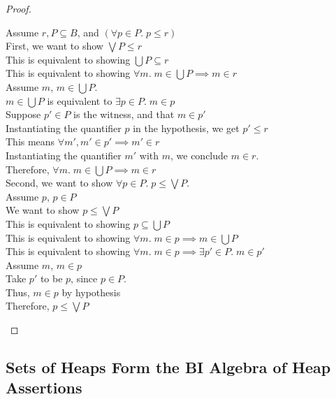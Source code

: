 \begin{proof}
\begin{enumerate}
  \begin{tabbedproof}
    \oo Assume $r, P \subseteq B$, and $(\forall p \in P.\; p \leq r)$ \\[1em]
    \ooo First, we want to show $\bigvee P \leq r$ \\
    \oooo This is equivalent to showing $\bigcup P \subseteq r$ \\
    \oooo This is equivalent to showing $\forall m.\; m \in \bigcup P \implies m \in r$ \\
    \oooo Assume $m$, $m \in \bigcup P$. \\
    \ooooo $m \in \bigcup P$ is equivalent to $\exists p \in P.\; m \in p$ \\
    \ooooo Suppose $p' \in P$ is the witness, and that $m \in p'$ \\ 
    \oooooo Instantiating the quantifier $p$ in the hypothesis, we get $p' \leq r$ \\
    \oooooo This means $\forall m', m' \in p' \implies m' \in r$ \\
    \oooooo Instantiating the quantifier $m'$ with $m$,  we conclude $m \in r$.  \\
    \oooo Therefore, $\forall m.\; m \in \bigcup P \implies m \in r$ \\[1em]
    \ooo Second, we want to show $\forall p \in P.\; p \leq \bigvee P$. \\
    \oooo Assume $p$, $p \in P$ \\
    \ooooo We want to show $p \leq \bigvee P$ \\
    \ooooo This is equivalent to showing $p \subseteq \bigcup P$ \\
    \ooooo This is equivalent to showing $\forall m.\; m \in p \implies m \in \bigcup P$ \\
    \ooooo This is equivalent to showing $\forall m.\; m \in p \implies \exists p' \in P.\; m \in p'$ \\
    \ooooo Assume $m$, $m \in p$ \\
    \oooooo Take $p'$ to be $p$, since $p \in P$. \\
    \oooooo Thus, $m \in p$ by hypothesis \\
    \oooo Therefore, $p \leq \bigvee P$ \\
  \end{tabbedproof}

\end{enumerate}


\end{proof}

\subsection{Sets of Heaps Form the BI Algebra of Heap Assertions}

